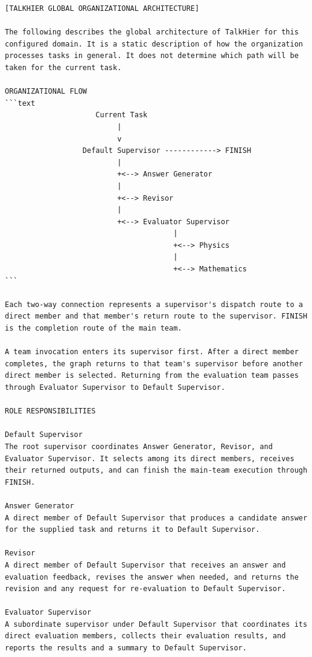 \documentclass[10pt,letterpaper,twocolumn]{article}
\begin{document}
\begin{Verbatim}[fontsize=\small,breaklines=true,breakanywhere=true]
[TALKHIER GLOBAL ORGANIZATIONAL ARCHITECTURE]

The following describes the global architecture of TalkHier for this configured domain. It is a static description of how the organization processes tasks in general. It does not determine which path will be taken for the current task.

ORGANIZATIONAL FLOW
```text
                     Current Task
                          |
                          v
                  Default Supervisor ------------> FINISH
                          |
                          +<--> Answer Generator
                          |
                          +<--> Revisor
                          |
                          +<--> Evaluator Supervisor
                                       |
                                       +<--> Physics
                                       |
                                       +<--> Mathematics
```

Each two-way connection represents a supervisor's dispatch route to a direct member and that member's return route to the supervisor. FINISH is the completion route of the main team.

A team invocation enters its supervisor first. After a direct member completes, the graph returns to that team's supervisor before another direct member is selected. Returning from the evaluation team passes through Evaluator Supervisor to Default Supervisor.

ROLE RESPONSIBILITIES

Default Supervisor
The root supervisor coordinates Answer Generator, Revisor, and Evaluator Supervisor. It selects among its direct members, receives their returned outputs, and can finish the main-team execution through FINISH.

Answer Generator
A direct member of Default Supervisor that produces a candidate answer for the supplied task and returns it to Default Supervisor.

Revisor
A direct member of Default Supervisor that receives an answer and evaluation feedback, revises the answer when needed, and returns the revision and any request for re-evaluation to Default Supervisor.

Evaluator Supervisor
A subordinate supervisor under Default Supervisor that coordinates its direct evaluation members, collects their evaluation results, and reports the results and a summary to Default Supervisor.


\end{Verbatim}
\end{document}
